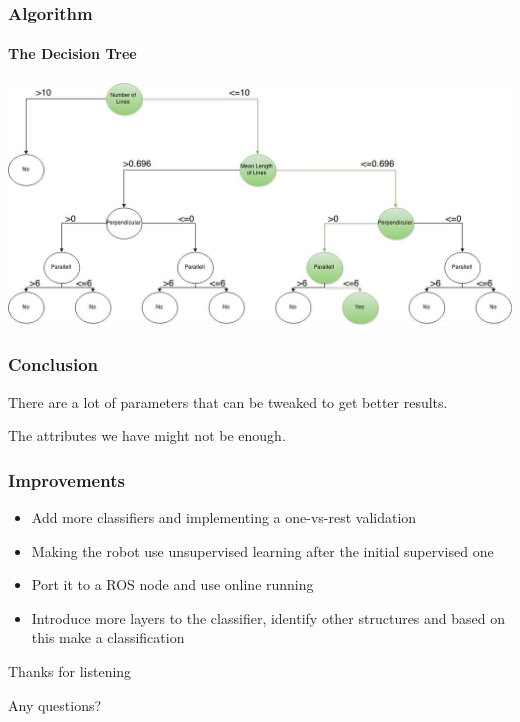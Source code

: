 \documentclass{beamer}
\begin{document}
\begin{frame}[fragile]
\frametitle{Algorithm}
\framesubtitle{The Decision Tree}
\includegraphics[scale=0.3]{presimg/id3.jpg}

\end{frame}

\begin{frame}
\frametitle{Conclusion}
 There are a lot of parameters that can be tweaked to get better results.

 \pause 
 \vspace{10pt}

The attributes we have might not be enough.
\end{frame}

\begin{frame}
\frametitle{Improvements}

\begin{itemize}
\item{Add more classifiers and implementing a one-vs-rest validation}
\pause
\item{Making the robot use unsupervised learning after the initial supervised one}
\pause
\item{Port it to a ROS node and use online running}
\pause
\item{Introduce more layers to the classifier, identify other structures and based on this make a classification}
\end{itemize}

\end{frame}

\begin{frame}

\centering

Thanks for listening

\vspace{10pt}

Any questions?

\end{frame}
\end{document}
